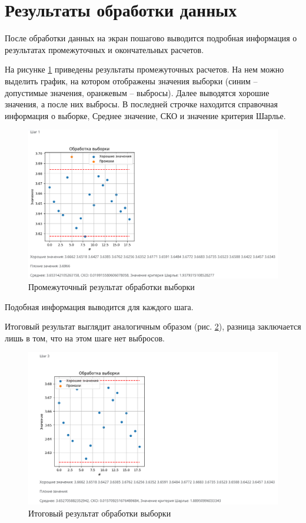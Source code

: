 \documentclass[a4paper,14pt]{article}
\begin{document}
\section{Результаты обработки данных}

	После обработки данных на экран пошагово выводится подробная информация о результатах промежуточных и окончательных расчетов.
	
	На рисунке \ref{fig:screenshot004} приведены результаты промежуточных расчетов.
	На нем можно выделить график, на котором отображены значения выборки (синим -- допустимые значения, оранжевым -- выбросы).
	Далее выводятся хорошие значения, а после них выбросы.
	В последней строчке находится справочная информация о выборке, Среднее значение, СКО и значение критерия Шарлье. 
	
	\begin{figure}[H]
		\centering
		\includegraphics[width=0.95\linewidth]{images/screenshot004}
		\caption{Промежуточный результат обработки выборки}
		\label{fig:screenshot004}
	\end{figure}

	Подобная информация выводится для каждого шага.	
	
	Итоговый результат выглядит аналогичным образом (рис. \ref{fig:screenshot005}), разница заключается лишь в том, что на этом шаге нет выбросов.
	
	\begin{figure}[H]
		\centering
		\includegraphics[width=0.95\linewidth]{images/screenshot005}
		\caption{Итоговый результат обработки выборки}
		\label{fig:screenshot005}
	\end{figure}
	
\end{document}
